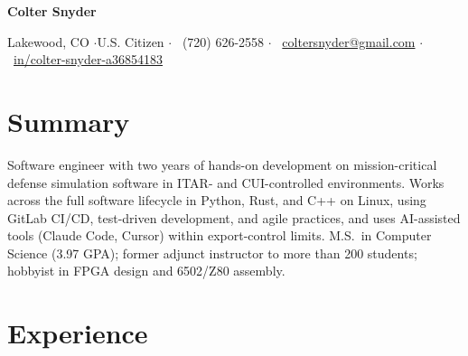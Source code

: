 \documentclass[letterpaper,10pt]{article}
\begin{document}
\begin{center}
  {\Huge\bfseries Colter Snyder}\par\vspace{4pt}
  \small
  Lakewood, CO \enspace$\cdot$\enspace U.S. Citizen \enspace$\cdot$\enspace
  \faPhone*\ (720) 626-2558 \enspace$\cdot$\enspace
  \faEnvelope\ \href{mailto:coltersnyder@gmail.com}{coltersnyder@gmail.com} \enspace$\cdot$\enspace
  \faLinkedin\ \href{https://www.linkedin.com/in/colter-snyder-a36854183/}{in/colter-snyder-a36854183}
\end{center}

\section{Summary}
Software engineer with two years of hands-on development on mission-critical defense simulation
software in ITAR- and CUI-controlled environments. Works across the full software lifecycle in Python,
Rust, and C++ on Linux, using GitLab CI/CD, test-driven development, and agile practices, and uses
AI-assisted tools (Claude Code, Cursor) within export-control limits. M.S.\ in Computer Science (3.97 GPA); former adjunct
instructor to more than 200 students; hobbyist in FPGA design and 6502/Z80 assembly.

\section{Experience}
\end{document}
